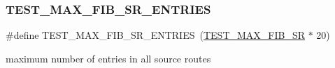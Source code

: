 \subsubsection{\texorpdfstring{T\+E\+S\+T\+\_\+\+M\+A\+X\+\_\+\+F\+I\+B\+\_\+\+S\+R\+\_\+\+E\+N\+T\+R\+I\+ES}{TEST\_MAX\_FIB\_SR\_ENTRIES}}
{\footnotesize\ttfamily \#define T\+E\+S\+T\+\_\+\+M\+A\+X\+\_\+\+F\+I\+B\+\_\+\+S\+R\+\_\+\+E\+N\+T\+R\+I\+ES~(\hyperlink{tests-fib__sr_8c_aa8679d92c7fab6c82b146daa69821eef}{T\+E\+S\+T\+\_\+\+M\+A\+X\+\_\+\+F\+I\+B\+\_\+\+SR} $\ast$ 20)}



maximum number of entries in all source routes 

